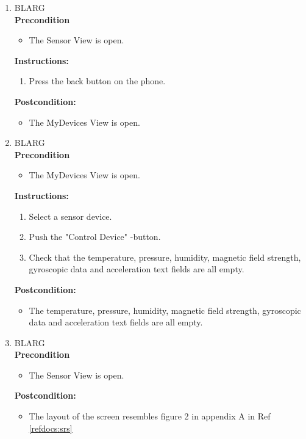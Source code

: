 \documentclass[a4paper]{article}
\newlength{\testlabellength}
\newenvironment{testlist}{\begin{enumerate}[label=\bfseries Instruction \thesubsection.\arabic* , labelindent=0pt, labelwidth=\testlabellength , leftmargin=2cm]}{\end{enumerate}}
\newenvironment{precondition}{
{\color{white}BLARG}\\ 
\textbf{Precondition}
\begin{itemize}[labelindent=0cm, labelwidth=2cm , leftmargin=1cm]
}
{\end{itemize}}
\newenvironment{instruction}{
\textbf{Instructions:}
\begin{enumerate}[label=\bfseries  \arabic*., labelindent=0cm, labelwidth=2cm , leftmargin=1cm]
}
{\end{enumerate}}
\newenvironment{postcondition}{
\textbf{Postcondition:}
\begin{itemize}[labelindent=0cm, labelwidth=2cm , leftmargin=1cm]
}
{\end{itemize}}
\begin{document}
\begin{appendices}
\begin{testlist}

	\item
		\begin{precondition}
			\item The Sensor View is open.
		\end{precondition}
		\begin{instruction}
			\item Press the back button on the phone.
		\end{instruction}
		\begin{postcondition}
			\item The MyDevices View is open.
		\end{postcondition}


	\item
		\begin{precondition}
			\item The MyDevices View is open.
		\end{precondition}
		\begin{instruction}			
			\item Select a sensor device.
			\item Push the "Control Device" -button.
			\item Check that the temperature, pressure, humidity, magnetic field strength, gyroscopic data and acceleration text fields are all empty.
		\end{instruction}
		\begin{postcondition}
			\item The temperature, pressure, humidity, magnetic field strength, gyroscopic data and acceleration text fields are all empty.
		\end{postcondition}


	\item
		\begin{precondition}
			\item The Sensor View is open.
		\end{precondition}
		\begin{postcondition}
			\item The layout of the screen resembles figure 2 in appendix A in Ref \ref{refdocs:srs}
		\end{postcondition}





\end{testlist}
\end{appendices}
\end{document}
